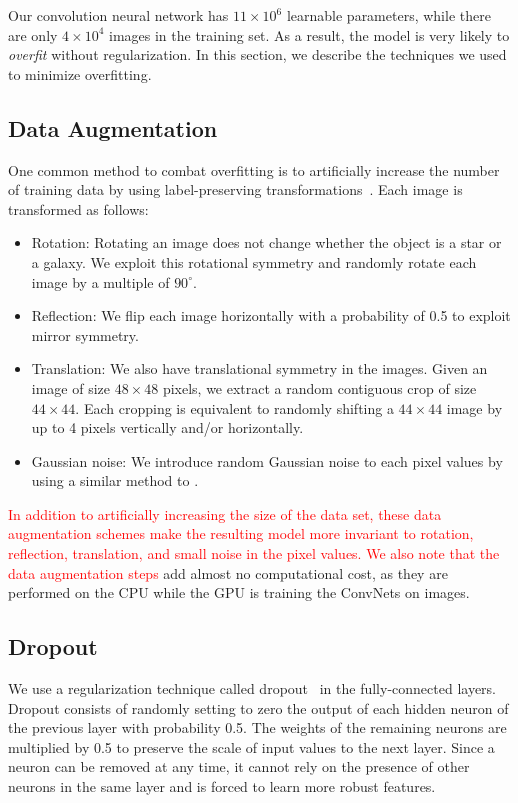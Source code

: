 \documentclass[fleqn,usenatbib]{mnras}
\newcommand{\changed}[1]{\textcolor{red}{#1}}
\begin{document}
Our convolution neural network has $11\times10^6$ learnable parameters,
while there are only $4\times10^4$ images in the training set.
As a result, the model is very likely to \emph{overfit} without regularization.
In this section, we describe the techniques we used to minimize overfitting.

\subsection{Data Augmentation}
  \label{sec:data_augmentation}
  
One common method to combat overfitting is to artificially increase
the number of training data by using label-preserving
transformations~\citep{krizhevsky2012imagenet,dieleman2015rotation,dieleman2016exploiting}.
Each image is transformed as follows:
\begin{itemize}
\item{Rotation: 
Rotating an image does not change whether the object is a star or a galaxy.
We exploit this rotational symmetry and randomly rotate each image by a multiple of
$90^{\circ}$. }

\item{Reflection:
We flip each image horizontally with a probability of 0.5 to exploit mirror symmetry. }
\item{Translation:
We also have translational symmetry in the images.
Given an image of size $48\times48$ pixels, we extract a random contiguous crop
of size $44\times44$.
Each cropping is equivalent to randomly shifting a $44\times44$ image by up to 4 pixels
vertically and/or horizontally. }
\item{Gaussian noise:
We introduce random Gaussian noise to each pixel values
by using a similar method to \cite{krizhevsky2012imagenet}.}
\end{itemize}
\changed{
In addition to artificially increasing the size of the data set,
these data augmentation schemes make the resulting model more invariant to
rotation, reflection, translation, and small noise in the pixel values.
We also note that the data augmentation steps
}
add almost no computational cost,
as they are performed on the CPU while the GPU is training the ConvNets on images.

\subsection{Dropout}

We use a regularization technique called dropout~\citep{hinton2012improving}
in the fully-connected layers.
Dropout consists of randomly setting to zero
the output of each hidden neuron of the previous layer with probability 0.5.
The weights of the remaining neurons are multiplied by 0.5 to preserve
the scale of input values to the next layer.
Since a neuron can be removed at any time, it cannot rely on the presence of other neurons
in the same layer and is forced to learn more robust features.
\end{document}
